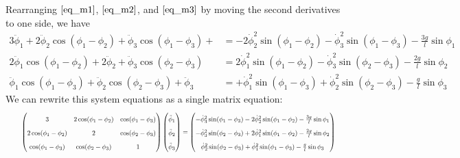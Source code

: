 \documentclass{article}
\begin{document}
\begin{appendices}
    Rearranging $\eqref{eq_m1}$, $\eqref{eq_m2}$, and $\eqref{eq_m3}$ by moving
    the second derivatives to one side, we have
    \begin{align}
         3\ddot\phi_1 + 2\ddot\phi_2\cos(\phi_1-\phi_2) + \ddot\phi_3\cos(\phi_1-\phi_3) + 
             &= -2\dot\phi_2^2\sin(\phi_1-\phi_2) - \dot\phi_3^2\sin(\phi_1-\phi_3)
             -\frac{3g}{l}\sin\phi_1 \\
        2\ddot\phi_1\cos(\phi_1-\phi_2)+ 2\ddot\phi_2 + \ddot\phi_3\cos(\phi_2-\phi_3)
            &= 2\dot\phi_1^2\sin(\phi_1-\phi_2) - \dot\phi_3^2\sin(\phi_2-\phi_3)
            -\frac{2g}{l}\sin\phi_2 \\
        \ddot\phi_1\cos(\phi_1-\phi_3)+\ddot\phi_2\cos(\phi_2-\phi_3)+\ddot\phi_3
            &= + \dot\phi_1^2\sin(\phi_1-\phi_3) + \dot\phi_2^2\sin(\phi_2-\phi_3)
            -\frac{g}{l}\sin\phi_3
    \end{align}
    We can rewrite this system  equations as a single matrix equation:
    \begingroup 
    \begin{equation} 
        \renewcommand*{\arraystretch}{1.75} %
        \resizebox{0.95\textwidth}{!}{$
        \begin{pmatrix}
            3                    & 2\cos(\phi_1-\phi_2) & \cos(\phi_1-\phi_3) \\
            2\cos(\phi_1-\phi_2) & 2                    & \cos(\phi_2-\phi_3) \\
            \cos(\phi_1-\phi_3)  & \cos(\phi_2-\phi_3)  & 1                   \\
        \end{pmatrix}
        \begin{pmatrix}
            \ddot\phi_1 \\
            \ddot\phi_2 \\
            \ddot\phi_3
        \end{pmatrix} =
        \begin{pmatrix}
            -\dot\phi_3^2\sin(\phi_1-\phi_3) -2\dot\phi_2^2\sin(\phi_1-\phi_2)
                -\frac{3g}{l}\sin\phi_1 \\
            -\dot\phi_3^2\sin(\phi_2-\phi_3) + 2\dot\phi_1^2\sin(\phi_1-\phi_2)
                -\frac{2g}{l}\sin\phi_2 \\
            \dot\phi_2^2\sin(\phi_2-\phi_3) + \dot\phi_1^2\sin(\phi_1-\phi_3)
                -\frac{g}{l}\sin\phi_3
        \end{pmatrix}
        $}
    \end{equation} 

\end{appendices}
\end{document}
